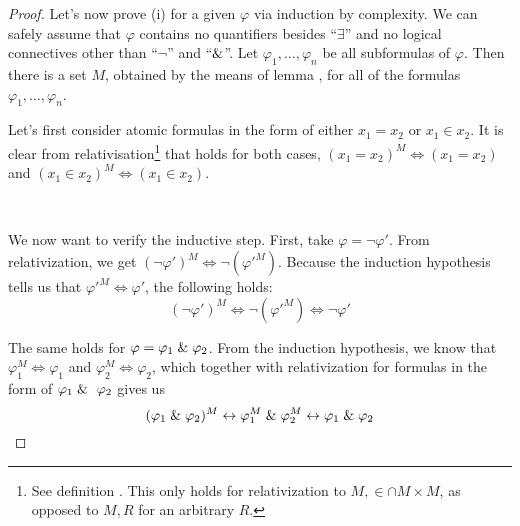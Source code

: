 \begin{proof}
Let's now prove (i) for a given $\varphi$ via induction by complexity. We can safely assume that $\varphi$ contains no quantifiers besides ``$\exists$'' and no logical connectives other than ``$\neg$'' and ``$\mathrel{\&}$''.
Let $\varphi_1, \ldots, \varphi_n$ be all subformulas of $\varphi$. Then there is a set $M$, obtained by the means of lemma , for all of the formulas $\varphi_1, \ldots, \varphi_n$. 

Let's first consider atomic formulas in the form of either $x_1 = x_2$ or $x_1 \in x_2$. %
It is clear from relativisation\footnote{See definition . This only holds for relativization to $M, \in \cap M \times M$, as opposed to $M, R$ for an arbitrary $R$.} that  holds for both cases, $(x_1 = x_2)^M \iff (x_1 = x_2)$ and $(x_1 \in x_2)^M \iff (x_1 \in x_2)$.

\

We now want to verify the inductive step. First, take $\varphi = \neg \varphi'$. From relativization, we get $(\neg \varphi')^M \iff \neg (\varphi'^M)$.
Because the induction hypothesis tells us that $\varphi'^M \iff \varphi'$, the following holds:
\begin{equation}
(\neg \varphi')^{M} \iff \neg (\varphi'^M) \iff \neg \varphi'
\end{equation}

The same holds for $\varphi = \varphi_1 \mathrel{\&} \varphi_2$. From the induction hypothesis, we know that $\varphi_1^M \iff \varphi_1$ and $\varphi_2^M \iff \varphi_2$, which together with relativization for formulas in the form of $\varphi_1 \et \varphi_2$ gives us
\begin{equation}
(\varphi_1 \mathrel{\&} \varphi_2)^M \leftrightarrow \varphi_1^M \mathrel{\&} \varphi_2^M \leftrightarrow \varphi_1 \mathrel{\&} \varphi_2
\end{equation}


\end{proof}
